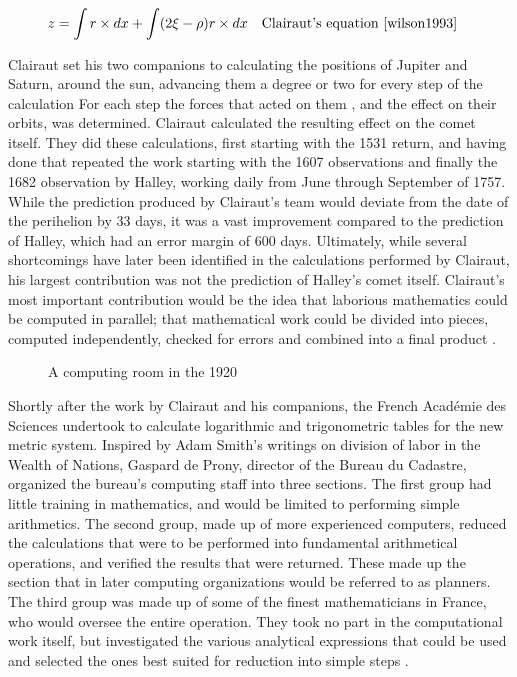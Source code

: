 \documentclass[../main.tex]{subfiles}
\begin{document}
\begin{align*} \label{eqn:clairaut}
  z &= \int r \times dx + \int (2 \xi - \rho)r \times dx && \text{Clairaut's equation \cite{wilson1993}}
\end{align*}

Clairaut set his two companions to calculating the positions of Jupiter and Saturn, around the sun, advancing them a degree or two for every step of the calculation
For each step the forces that acted on them , and the effect on their orbits, was determined.
Clairaut calculated the resulting effect on the comet itself.
They did these calculations, first starting with the 1531 return, and having done that repeated the work starting with the 1607 observations and finally the 1682 observation by Halley,
working daily from June through September of 1757.
While the prediction produced by Clairaut's team would deviate from the date of the perihelion by 33 days, it was a vast improvement compared to the prediction of Halley, which had an error margin of 600 days.
Ultimately, while several shortcomings have later been identified in the calculations performed by Clairaut, his largest contribution was not the prediction of Halley's comet itself.
Clairaut's most important contribution would be the idea that laborious mathematics could be computed in parallel;
that mathematical work could be divided into pieces, computed independently, checked for errors and combined into a final product \cite{grier1955}.

\begin{figure}[h]
    \caption{A computing room in the 1920}
    \label{fig:tabulatingroom}
\end{figure}

Shortly after the work by Clairaut and his companions, the French Académie des Sciences undertook to calculate logarithmic and trigonometric tables for the new metric system.
Inspired by Adam Smith's writings on division of labor in the Wealth of Nations, Gaspard de Prony, director of the Bureau du Cadastre, organized the bureau's computing staff into three sections.
The first group had little training in mathematics, and would be limited to performing simple arithmetics.
The second group, made up of more experienced computers, reduced the calculations that were to be performed into fundamental arithmetical operations, and verified the results that were returned.
These made up the section that in later computing organizations would be referred to as planners.
The third group was made up of some of the finest mathematicians in France, who would oversee the entire operation.
They took no part in the computational work itself, but investigated the various analytical expressions that could be used and selected the ones best suited for reduction into simple steps \cite{hyman1985}.
\end{document}
